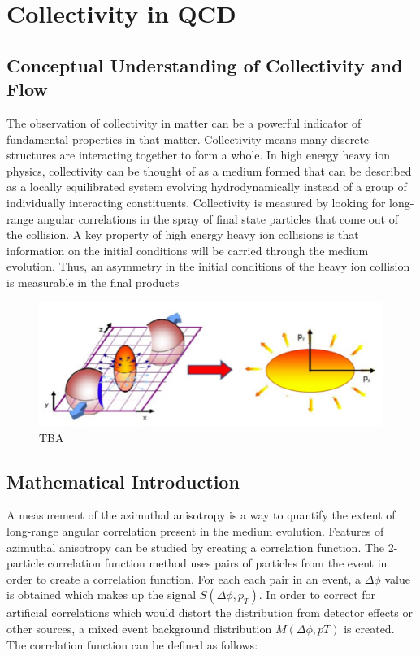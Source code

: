 \chapter{Collectivity in QCD}
\section{Conceptual Understanding of Collectivity and Flow}
The observation of collectivity in matter can be a powerful indicator of fundamental properties in that matter. Collectivity means many discrete structures are interacting together to form a whole. In high energy heavy ion physics, collectivity can be thought of as a medium formed that can be described as a locally equilibrated system evolving hydrodynamically instead of a group of individually interacting constituents. Collectivity is measured by looking for long-range angular correlations in the spray of final state particles that come out of the collision. A key property of high energy heavy ion collisions is that information on the initial conditions will be carried through the medium evolution. Thus, an asymmetry in the initial conditions of the heavy ion collision is measurable in the final products
\begin{figure}[h!]
\begin{center}
\includegraphics[width=0.45\linewidth]{figs/elliptical_flow_cartoon.png}
\caption{ TBA }
\end{center}
\end{figure}

\section{Mathematical Introduction}
A measurement of the azimuthal anisotropy is a way to quantify the extent of long-range angular correlation present in the medium evolution. Features of azimuthal anisotropy can be studied by creating a correlation function. The 2-particle correlation function method uses pairs of particles from the event in order to create a correlation function. For each each pair in an event, a $\Delta\phi$ value is obtained which makes up the signal $S(\Delta\phi,p_T)$. In order to correct for artificial correlations which would distort the distribution from detector effects or other sources, a mixed event background distribution $M(\Delta\phi,pT)$ is created. The correlation function can be defined as follows:

